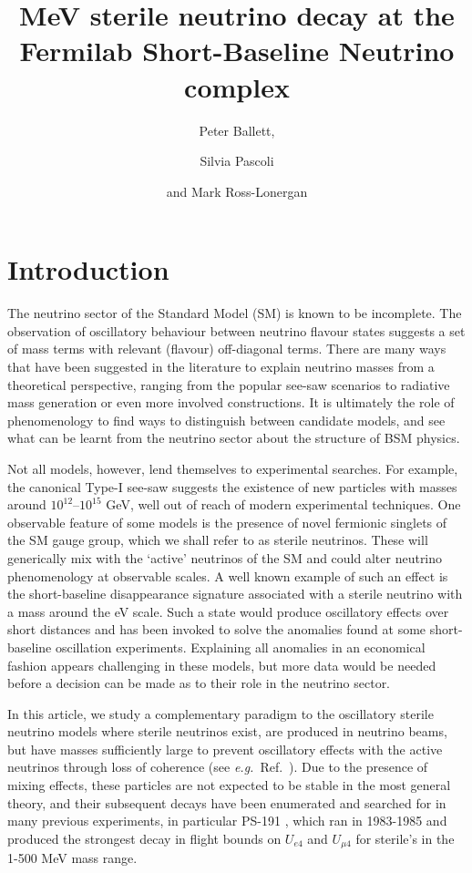 \documentclass[11pt, a4paper]{article}
\title{MeV sterile neutrino decay at the Fermilab Short-Baseline Neutrino complex}
\author{Peter Ballett,}
\author{Silvia Pascoli}
\author{and Mark Ross-Lonergan}
\affiliation{Institute for Particle Physics Phenomenology, Department of
Physics, Durham University, South Road, Durham DH1 3LE, United Kingdom}
\newcommand{\refref}[1]{Ref.~\cite{#1}}
\def\eg{\emph{e.g.}}
\begin{document}
 

\maketitle

\section{Introduction}

The neutrino sector of the Standard Model (SM) is known to be incomplete. The
observation of oscillatory behaviour between neutrino flavour states suggests a
set of mass terms with relevant (flavour) off-diagonal terms. There are many
ways that have been suggested in the literature to explain neutrino masses from
a theoretical perspective, ranging from the popular see-saw scenarios to
radiative mass generation or even more involved constructions. It is ultimately
the role of phenomenology to find ways to distinguish between candidate models,
and see what can be learnt from the neutrino sector about the structure of BSM
physics.

Not all models, however, lend themselves to experimental searches. For example,
the canonical Type-I see-saw \cite{Minkowski:1977sc, GellMann:1980vs,
Mohapatra:1979ia} suggests the existence of new particles with masses around
$10^{12}$--$10^{15}$ GeV, well out of reach of modern experimental techniques. One
observable feature of some models is the presence of novel fermionic singlets
of the SM gauge group, which we shall refer to as sterile neutrinos. These will
generically mix with the `active' neutrinos of the SM and could alter neutrino
phenomenology at observable scales. 
%
A well known example of such an effect is the short-baseline disappearance
signature associated with a sterile neutrino with a mass around the eV scale. Such a state
would produce oscillatory effects over short distances and has been invoked to
solve the anomalies found at some short-baseline oscillation experiments.
Explaining all anomalies in an economical fashion appears challenging in these
models, but more data would be needed before a decision can be made as to their
role in the neutrino sector.

In this article, we study a complementary paradigm to the oscillatory sterile
neutrino models where sterile neutrinos exist, are produced in neutrino beams,
but have masses sufficiently large to prevent oscillatory effects with the
active neutrinos through loss of coherence (see \eg\ \refref{Akhmedov:2009rb}).
Due to the presence of mixing effects, these particles are not expected to be
stable in the most general theory, and their subsequent decays have been
enumerated \cite{Atre:2009rg} and searched for in many previous experiments, in particular PS-191 \cite{Bernardi:1985ny},  which ran in 1983-1985 and produced the strongest decay in flight bounds on $U_{e4}$ and $U_{\mu 4}$ for sterile's in the 1-500 MeV mass range.%
\end{document}
